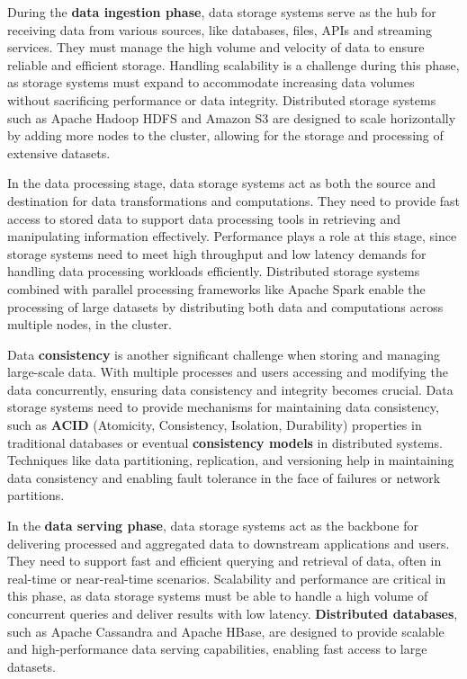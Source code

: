 During the \textbf{data ingestion phase}, data storage systems serve as the hub for receiving data from various sources, like databases, files, APIs and streaming services. They must manage the high volume and velocity of data to ensure reliable and efficient storage. Handling scalability is a challenge during this phase, as storage systems must expand to accommodate increasing data volumes without sacrificing performance or data integrity. Distributed storage systems such as Apache Hadoop HDFS and Amazon S3 are designed to scale horizontally by adding more nodes to the cluster, allowing for the storage and processing of extensive datasets\footnotemark[20].

In the data processing stage, data storage systems act as both the source and destination for data transformations and computations. They need to provide fast access to stored data to support data processing tools in retrieving and manipulating information effectively. Performance plays a role at this stage, since storage systems need to meet high throughput and low latency demands for handling data processing workloads efficiently. Distributed storage systems combined with parallel processing frameworks like Apache Spark enable the processing of large datasets by distributing both data and computations across multiple nodes, in the cluster\footnotemark[20].

Data \textbf{consistency} is another significant challenge when storing and managing large-scale data. With multiple processes and users accessing and modifying the data concurrently, ensuring data consistency and integrity becomes crucial. Data storage systems need to provide mechanisms for maintaining data consistency, such as \textbf{ACID} (Atomicity, Consistency, Isolation, Durability) properties in traditional databases or eventual \textbf{consistency models} in distributed systems. Techniques like data partitioning, replication, and versioning help in maintaining data consistency and enabling fault tolerance in the face of failures or network partitions.

In the \textbf{data serving phase}, data storage systems act as the backbone for delivering processed and aggregated data to downstream applications and users. They need to support fast and efficient querying and retrieval of data, often in real-time or near-real-time scenarios. Scalability and performance are critical in this phase, as data storage systems must be able to handle a high volume of concurrent queries and deliver results with low latency. \textbf{Distributed databases}, such as Apache Cassandra and Apache HBase, are designed to provide scalable and high-performance data serving capabilities, enabling fast access to large datasets.

